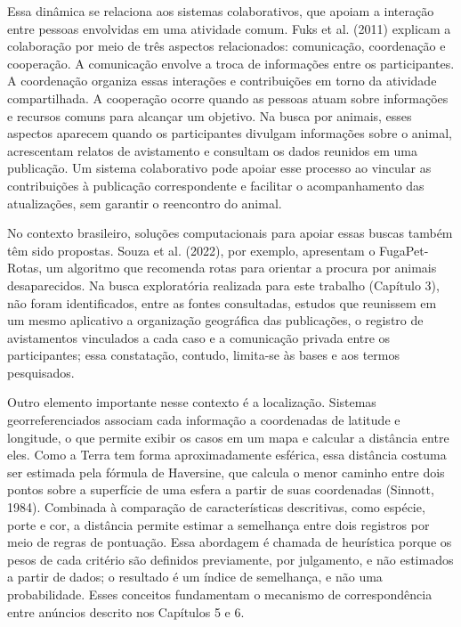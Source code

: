 Essa dinâmica se relaciona aos sistemas colaborativos, que apoiam a interação entre pessoas envolvidas em uma atividade comum. Fuks et al. (2011) explicam a colaboração por meio de três aspectos relacionados: comunicação, coordenação e cooperação. A comunicação envolve a troca de informações entre os participantes. A coordenação organiza essas interações e contribuições em torno da atividade compartilhada. A cooperação ocorre quando as pessoas atuam sobre informações e recursos comuns para alcançar um objetivo. Na busca por animais, esses aspectos aparecem quando os participantes divulgam informações sobre o animal, acrescentam relatos de avistamento e consultam os dados reunidos em uma publicação. Um sistema colaborativo pode apoiar esse processo ao vincular as contribuições à publicação correspondente e facilitar o acompanhamento das atualizações, sem garantir o reencontro do animal.

No contexto brasileiro, soluções computacionais para apoiar essas buscas também têm sido propostas. Souza et al. (2022), por exemplo, apresentam o FugaPet-Rotas, um algoritmo que recomenda rotas para orientar a procura por animais desaparecidos. Na busca exploratória realizada para este trabalho (Capítulo 3), não foram identificados, entre as fontes consultadas, estudos que reunissem em um mesmo aplicativo a organização geográfica das publicações, o registro de avistamentos vinculados a cada caso e a comunicação privada entre os participantes; essa constatação, contudo, limita-se às bases e aos termos pesquisados.

Outro elemento importante nesse contexto é a localização. Sistemas georreferenciados associam cada informação a coordenadas de latitude e longitude, o que permite exibir os casos em um mapa e calcular a distância entre eles. Como a Terra tem forma aproximadamente esférica, essa distância costuma ser estimada pela fórmula de Haversine, que calcula o menor caminho entre dois pontos sobre a superfície de uma esfera a partir de suas coordenadas (Sinnott, 1984). Combinada à comparação de características descritivas, como espécie, porte e cor, a distância permite estimar a semelhança entre dois registros por meio de regras de pontuação. Essa abordagem é chamada de heurística porque os pesos de cada critério são definidos previamente, por julgamento, e não estimados a partir de dados; o resultado é um índice de semelhança, e não uma probabilidade. Esses conceitos fundamentam o mecanismo de correspondência entre anúncios descrito nos Capítulos 5 e 6.

